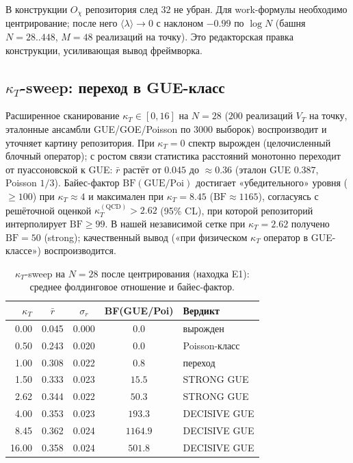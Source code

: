 \documentclass[11pt,a4paper]{article}
\begin{document}
\begin{findbox}
В конструкции $O_\chi$ репозитория след $32$ не убран. Для work-формулы
необходимо центрирование; после него $\langle\lambda\rangle \to 0$ с наклоном
$-0.99$ по $\log N$ (башня $N = 28..448$, $M = 48$ реализаций на точку). Это
редакторская правка конструкции, усиливающая вывод фреймворка.
\end{findbox}

\subsection{$\kappa_T$-sweep: переход в GUE-класс}

Расширенное сканирование $\kappa_T \in [0, 16]$ на $N = 28$ ($200$ реализаций
$V_T$ на точку, эталонные ансамбли GUE/GOE/Poisson по $3000$ выборок)
воспроизводит и уточняет картину репозитория. При $\kappa_T = 0$ спектр
вырожден (целочисленный блочный оператор); с ростом связи статистика
расстояний монотонно переходит от пуассоновской к GUE: $\bar r$ растёт от
$0.045$ до $\approx 0.36$ (эталон GUE $0.387$, Poisson $1/3$). Байес-фактор
$\mathrm{BF}(\mathrm{GUE}/\mathrm{Poi})$ достигает «убедительного» уровня
($\ge 100$) при $\kappa_T \approx 4$ и максимален при $\kappa_T = 8.45$
($\mathrm{BF} \approx 1165$), согласуясь с решёточной оценкой
$\kappa_T^{(\mathrm{QCD})} > 2.62$ (95\% CL), при которой репозиторий
интерполирует $\mathrm{BF} \ge 99$. В нашей независимой сетке при
$\kappa_T = 2.62$ получено $\mathrm{BF} = 50$ (strong); качественный вывод
(«при физическом $\kappa_T$ оператор в GUE-классе») воспроизводится.

\begin{table}[htbp]
\centering\small
\caption{$\kappa_T$-sweep на $N = 28$ после центрирования (находка E1):
среднее фолдинговое отношение и байес-фактор.}
\label{tab:kappa}
\begin{tabular}{rcccl}
\toprule
$\kappa_T$ & $\bar r$ & $\sigma_r$ & BF(GUE/Poi) & Вердикт \\
\midrule
0.00 & 0.045 & 0.000 & $0.0$ & вырожден \\
0.50 & 0.243 & 0.020 & $0.0$ & Poisson-класс \\
1.00 & 0.308 & 0.022 & $0.8$ & переход \\
1.50 & 0.333 & 0.023 & $15.5$ & STRONG GUE \\
2.62 & 0.344 & 0.022 & $50.3$ & STRONG GUE \\
4.00 & 0.353 & 0.023 & $193.3$ & DECISIVE GUE \\
8.45 & 0.362 & 0.024 & $1164.9$ & DECISIVE GUE \\
16.00 & 0.358 & 0.024 & $501.8$ & DECISIVE GUE \\
\bottomrule
\end{tabular}
\end{table}
\end{document}
